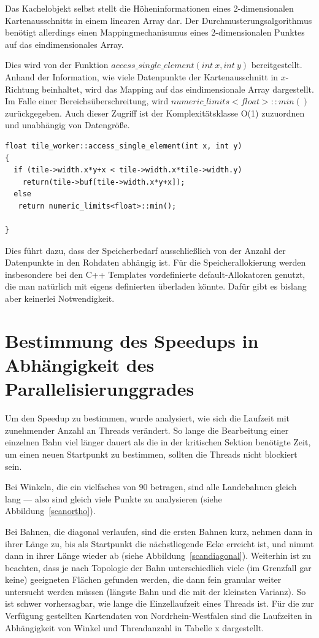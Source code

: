 \documentclass[10pt,a4paper]{report}
\begin{document}
Das Kachelobjekt selbst stellt die Höheninformationen eines 2-dimensionalen Kartenausschnitts in einem linearen Array dar. Der Durchmusterungsalgorithmus benötigt allerdings einen Mappingmechanisumus eines 2-dimensionalen Punktes auf das eindimensionales Array.

Dies wird von der Funktion $access\_single\_element(int\ x, int\ y)$ bereitgestellt. Anhand der Information, wie viele Datenpunkte der Kartenausschnitt in $x$-Richtung beinhaltet, wird das Mapping auf das eindimensionale Array dargestellt. Im Falle einer Bereichsüberschreitung, wird $numeric\_limits<float>::min()$ zurückgegeben.
Auch dieser Zugriff ist der Komplexitätsklasse O(1) zuzuordnen und unabhängig von Datengröße.

\begin{lstlisting}
float tile_worker::access_single_element(int x, int y)
{
  if (tile->width.x*y+x < tile->width.x*tile->width.y)
    return(tile->buf[tile->width.x*y+x]);
  else
   return numeric_limits<float>::min();

}
\end{lstlisting}

Dies führt dazu, dass der Speicherbedarf ausschließlich von der Anzahl der Datenpunkte in den Rohdaten abhängig ist. Für die Speicherallokierung werden insbesondere bei den C++ Templates vordefinierte default-Allokatoren genutzt, die man natürlich mit eigens definierten überladen könnte. Dafür gibt es bislang aber keinerlei Notwendigkeit.
 


\section{Bestimmung des Speedups in Abhängigkeit des Parallelisierunggrades}

Um den Speedup zu bestimmen, wurde analysiert, wie sich die Laufzeit mit zunehmender Anzahl an Threads verändert. So lange die Bearbeitung einer einzelnen Bahn viel länger dauert als die in der kritischen Sektion benötigte Zeit, um einen neuen Startpunkt zu bestimmen, sollten die Threads nicht blockiert sein.

Bei Winkeln, die ein vielfaches von $90$ betragen, sind alle Landebahnen gleich lang --- also sind gleich viele Punkte zu analysieren (siehe Abbildung~\ref{scanortho}).

Bei Bahnen, die diagonal verlaufen, sind die ersten Bahnen kurz, nehmen dann in ihrer Länge zu, bis als Startpunkt die nächstliegende Ecke erreicht ist, und nimmt dann in ihrer Länge wieder ab (siehe Abbildung~\ref{scandiagonal}). 
Weiterhin ist zu beachten, dass je nach Topologie der Bahn unterschiedlich viele (im Grenzfall gar keine) geeigneten Flächen gefunden werden, die dann fein granular weiter untersucht werden müssen (längste Bahn und die mit der kleinsten Varianz). So ist schwer vorhersagbar, wie lange die Einzellaufzeit eines Threads ist.
Für die zur Verfügung gestellten Kartendaten von Nordrhein-Westfalen sind die Laufzeiten in Abhängigkeit von Winkel und Threadanzahl in Tabelle x dargestellt.
\end{document}
